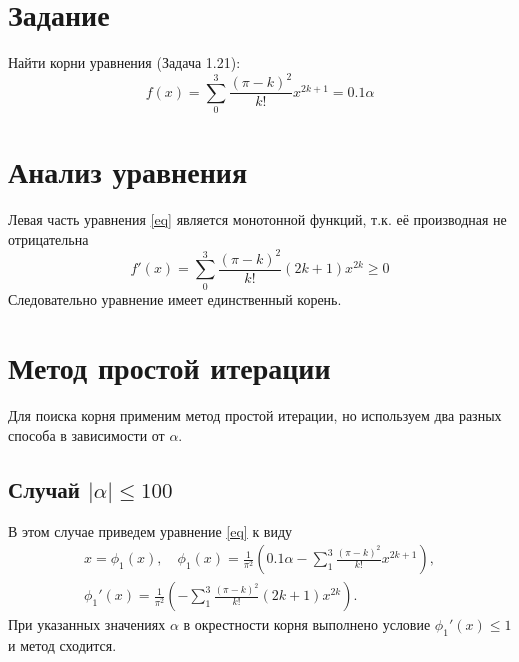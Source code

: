 \documentclass[a4paper,12pt]{article}
\newcommand{\UpdateMe}[1]{\textcolor{red}{#1}}
\newcommand{\University}{Московский государственный университет имени М.~В.~Ломоносова}
\newcommand{\Department}{Кафедра \UpdateMe{НАЗВАНИЕ-КАФЕДРЫ}}
\newcommand{\Student}{\UpdateMe{ИМЯ-СТУДЕНТА}}
\newcommand{\GroupNum}{\UpdateMe{НОМЕР}}
\newcommand{\Seminar}{\UpdateMe{НАЗВАНИЕ-ПРАКТИКУМА}}
\begin{document}

\section*{Задание}
Найти корни уравнения (Задача 1.21):
\begin{equation} \label{eq}
  f(x)=\sum_{0}^{3}\frac{(\pi-k)^2}{k!}x^{2k+1}=0.1\alpha
\end{equation}

\section*{Анализ уравнения}
Левая часть уравнения \cref{eq} является монотонной функций, т.к. её производная не отрицательна
\begin{equation}
  f'(x)=\sum_{0}^{3}\frac{(\pi-k)^2}{k!}(2k+1)x^{2k} \ge 0
\end{equation}
Следовательно уравнение имеет единственный корень.


\section*{Метод простой итерации}
Для поиска корня применим метод простой итерации, но используем два разных способа в зависимости от \(\alpha\).
\subsection*{Случай \(\vert\alpha\vert\le100\)}
В этом случае приведем уравнение \cref{eq} к виду
\begin{gather}
  x = \phi_1(x), \quad \phi_1(x) = \frac{1}{\pi^2}\left(0.1 \alpha - \sum_{1}^{3}\frac{(\pi-k)^2}{k!}x^{2k+1}\right),\\
  \phi_1'(x) = \frac{1}{\pi^2}\left(- \sum_{1}^{3}\frac{(\pi-k)^2}{k!}(2k+1)x^{2k}\right).
\end{gather}
При указанных значениях \(\alpha\) в окрестности корня выполнено условие \(\phi_1'(x) \le 1\) и метод сходится.
\end{document}
